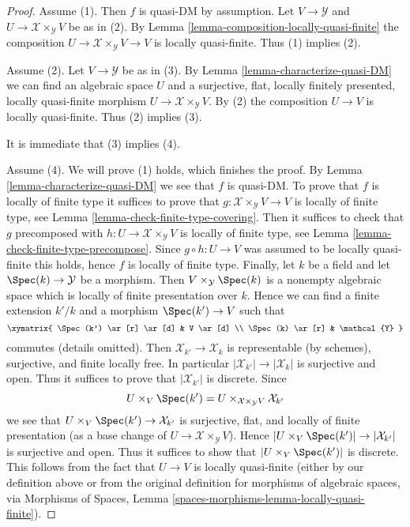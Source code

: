 \begin{proof}
Assume (1). Then $f$ is quasi-DM by assumption. Let
$V \to \mathcal{Y}$ and $U \to \mathcal{X} \times_\mathcal{Y} V$
be as in (2). By
Lemma \ref{lemma-composition-locally-quasi-finite}
the composition $U \to \mathcal{X} \times_\mathcal{Y} V \to V$ is
locally quasi-finite. Thus (1) implies (2).

\medskip\noindent
Assume (2). Let $V \to \mathcal{Y}$ be as in (3). By
Lemma \ref{lemma-characterize-quasi-DM}
we can find an algebraic space $U$ and a surjective, flat, locally
finitely presented, locally quasi-finite morphism
$U \to \mathcal{X} \times_\mathcal{Y} V$. By (2) the composition
$U \to V$ is locally quasi-finite. Thus (2) implies (3).

\medskip\noindent
It is immediate that (3) implies (4).

\medskip\noindent
Assume (4). We will prove (1) holds, which finishes the proof. By
Lemma \ref{lemma-characterize-quasi-DM}
we see that $f$ is quasi-DM. To prove that $f$ is locally of finite type
it suffices to prove that $g : \mathcal{X} \times_\mathcal{Y} V \to V$ is
locally of finite type, see
Lemma \ref{lemma-check-finite-type-covering}.
Then it suffices to check that $g$ precomposed with
$h : U \to \mathcal{X} \times_\mathcal{Y} V$ is locally of finite type, see
Lemma \ref{lemma-check-finite-type-precompose}.
Since $g \circ h : U \to V$ was assumed to be locally quasi-finite
this holds, hence $f$ is locally of finite type.
Finally, let $k$ be a field and let $\Spec(k) \to \mathcal{Y}$
be a morphism. Then $V \times_\mathcal{Y} \Spec(k)$ is
a nonempty algebraic space which is locally of finite presentation
over $k$. Hence we can find a finite extension $k'/k$ and
a morphism $\Spec(k') \to V$ such that
$$
\xymatrix{
\Spec(k') \ar[r] \ar[d] & V \ar[d] \\
\Spec(k) \ar[r] & \mathcal{Y}
}
$$
commutes (details omitted). Then $\mathcal{X}_{k'} \to \mathcal{X}_k$
is representable (by schemes), surjective, and finite locally free. In
particular $|\mathcal{X}_{k'}| \to |\mathcal{X}_k|$ is surjective and open.
Thus it suffices to prove that $|\mathcal{X}_{k'}|$ is discrete. Since
$$
U \times_V \Spec(k') =
U \times_{\mathcal{X} \times_\mathcal{Y} V} \mathcal{X}_{k'}
$$
we see that $U \times_V \Spec(k') \to \mathcal{X}_{k'}$ is
surjective, flat, and locally of finite presentation (as a base change
of $U \to \mathcal{X} \times_\mathcal{Y} V$). Hence
$|U \times_V \Spec(k')| \to |\mathcal{X}_{k'}|$ is surjective and
open. Thus it suffices to show that $|U \times_V \Spec(k')|$ is
discrete. This follows from the fact that $U \to V$ is locally
quasi-finite (either by our definition above or from the original definition
for morphisms of algebraic spaces, via
Morphisms of Spaces, Lemma \ref{spaces-morphisms-lemma-locally-quasi-finite}).
\end{proof}

